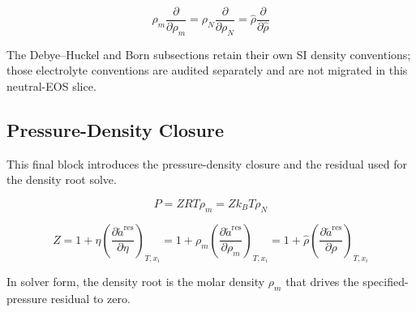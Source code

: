 \documentclass[12pt, letterpaper]{article}
\begin{document}
\begin{equation}
    \rho_m\frac{\partial}{\partial\rho_m}
    =\rho_N\frac{\partial}{\partial\rho_N}
    =\hat{\rho}\frac{\partial}{\partial\hat{\rho}}
    \label{eq:density_derivative_invariant}
\end{equation}

The Debye--Huckel and Born subsections retain their own SI density conventions; those electrolyte conventions are audited separately and are not migrated in this neutral-EOS slice.

\subsection{Pressure-Density Closure}

This final block introduces the pressure-density closure and the residual used for the density root solve.

\begin{equation}
    P = ZRT\rho_m = Zk_{B}T\rho_{N}
    \label{eq:pressure_from_z}
\end{equation}


\begin{equation}
    Z
    =
    1+\eta\left(\frac{\partial\tilde{a}^\mathrm{res}}{\partial\eta}\right)_{T,x_{i}}
    =
    1+\rho_m\left(\frac{\partial\tilde{a}^\mathrm{res}}{\partial\rho_m}\right)_{T,x_{i}}
    =
    1+\hat{\rho}\left(\frac{\partial\tilde{a}^\mathrm{res}}{\partial\hat{\rho}}\right)_{T,x_{i}}
    \label{eq:z_from_rho}
\end{equation}

In solver form, the density root is the molar density \(\rho_m\) that drives the specified-pressure residual to zero.

\end{document}
